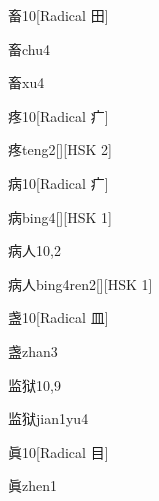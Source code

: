 \begin{entry}{畜}{10}[Radical ⽥]
  \begin{phonetics}{畜}{chu4}
  \end{phonetics}
  \begin{phonetics}{畜}{xu4}
  \end{phonetics}
\end{entry}

\begin{entry}{疼}{10}[Radical 疒]
  \begin{phonetics}{疼}{teng2}[][HSK 2]
  \end{phonetics}
\end{entry}

\begin{entry}{病}{10}[Radical 疒]
  \begin{phonetics}{病}{bing4}[][HSK 1]
  \end{phonetics}
\end{entry}

\begin{entry}{病人}{10,2}
  \begin{phonetics}{病人}{bing4ren2}[][HSK 1]
  \end{phonetics}
\end{entry}

\begin{entry}{盏}{10}[Radical 皿]
  \begin{phonetics}{盏}{zhan3}
  \end{phonetics}
\end{entry}

\begin{entry}{监狱}{10,9}
  \begin{phonetics}{监狱}{jian1yu4}
  \end{phonetics}
\end{entry}

\begin{entry}{眞}{10}[Radical 目]
  \begin{phonetics}{眞}{zhen1}
  \end{phonetics}
\end{entry}

